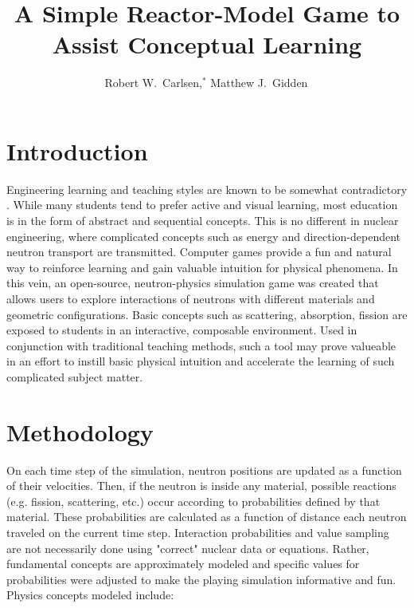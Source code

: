 \documentclass{anstrans}
\title{A Simple Reactor-Model Game to Assist Conceptual Learning}
\author{Robert W.~Carlsen,$^{*}$ Matthew J.~Gidden$^{\*}$}
\institute{
$^{*}$University of Wisconsin, Nuclear Engineering Dept., 1500 Engineering Dr., Madison, WI
}
\begin{document}
\section{Introduction}

Engineering learning and teaching styles are known to be somewhat contradictory
\cite{felder2000learning}. While many students tend to prefer active and visual
learning, most education is in the form of abstract and sequential
concepts. This is no different in nuclear engineering, where complicated
concepts such as energy and direction-dependent neutron transport are
transmitted. Computer games provide a fun and natural way to reinforce learning
and gain valuable intuition for physical phenomena. In this vein, an open-source,
neutron-physics simulation game was created that allows users to explore
interactions of neutrons with different materials and geometric
configurations. Basic concepts such as scattering, absorption, fission are
exposed to students in an interactive, composable environment. Used in
conjunction with traditional teaching methods, such a tool may prove valueable
in an effort to instill basic physical intuition and accelerate the learning of
such complicated subject matter.

\section{Methodology}

On each time step of the simulation, neutron positions are updated as a
function of their velocities.  Then, if the neutron is inside any material,
possible reactions (e.g. fission, scattering, etc.) occur according to
probabilities defined by that material.  These probabilities are calculated as
a function of distance each neutron traveled on the current time step.
Interaction probabilities and value sampling are not necessarily done using
"correct" nuclear data or equations.  Rather, fundamental concepts are
approximately modeled and specific values for probabilities were adjusted to
make the playing simulation informative and fun.  Physics concepts modeled
include:
\end{document}
